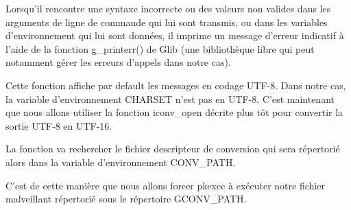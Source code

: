 \documentclass[12pt,a4paper]{article}
\begin{document}
\begin{flushleft}
            \item Lorsqu’il rencontre une syntaxe incorrecte ou des valeurs non valides dans les arguments de ligne de commande qui lui sont transmis, ou dans les variables d’environnement qui lui sont données, il imprime un message d’erreur indicatif à l’aide de la fonction g\_printerr() de Glib (une bibliothèque libre qui peut notamment gérer les erreurs d'appels dans notre cas).
            \item Cette fonction affiche par default les messages en codage UTF-8. Dans notre cas, la variable d'environnement CHARSET n'est pas en UTF-8. C'est maintenant que nous allons utiliser la fonction iconv\_open décrite plus tôt pour convertir la sortie UTF-8 en UTF-16.
            \item La fonction va rechercher le fichier descripteur de conversion qui sera répertorié alors dans la variable d'environnement CONV\_PATH.
            \item C'est de cette manière que nous allons forcer pkexec à exécuter notre fichier malveillant répertorié sous le répertoire GCONV\_PATH.



\end{flushleft}
\end{document}
